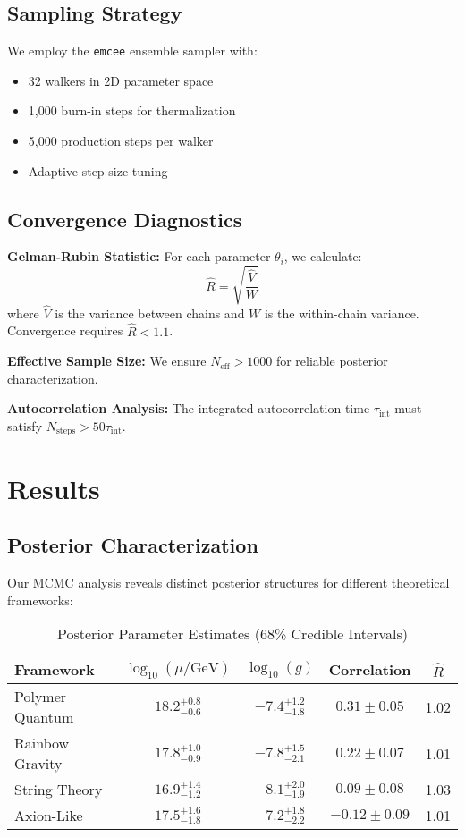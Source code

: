 \documentclass[12pt]{article}
\begin{document}
\subsection{Sampling Strategy}

We employ the \texttt{emcee} ensemble sampler with:
\begin{itemize}
\item 32 walkers in 2D parameter space
\item 1,000 burn-in steps for thermalization
\item 5,000 production steps per walker
\item Adaptive step size tuning
\end{itemize}

\subsection{Convergence Diagnostics}

\textbf{Gelman-Rubin Statistic:}
For each parameter $\theta_i$, we calculate:
\begin{equation}
\hat{R} = \sqrt{\frac{\hat{V}}{W}}
\end{equation}
where $\hat{V}$ is the variance between chains and $W$ is the within-chain variance. Convergence requires $\hat{R} < 1.1$.

\textbf{Effective Sample Size:}
We ensure $N_{\text{eff}} > 1000$ for reliable posterior characterization.

\textbf{Autocorrelation Analysis:}
The integrated autocorrelation time $\tau_{\text{int}}$ must satisfy $N_{\text{steps}} > 50\tau_{\text{int}}$.

\section{Results}

\subsection{Posterior Characterization}

Our MCMC analysis reveals distinct posterior structures for different theoretical frameworks:

\begin{table}[h]
\centering
\caption{Posterior Parameter Estimates (68\% Credible Intervals)}
\begin{tabular}{lcccc}
\toprule
Framework & $\log_{10}(\mu/\text{GeV})$ & $\log_{10}(g)$ & Correlation & $\hat{R}$ \\
\midrule
Polymer Quantum & $18.2^{+0.8}_{-0.6}$ & $-7.4^{+1.2}_{-1.8}$ & $0.31 \pm 0.05$ & 1.02 \\
Rainbow Gravity & $17.8^{+1.0}_{-0.9}$ & $-7.8^{+1.5}_{-2.1}$ & $0.22 \pm 0.07$ & 1.01 \\
String Theory & $16.9^{+1.4}_{-1.2}$ & $-8.1^{+2.0}_{-1.9}$ & $0.09 \pm 0.08$ & 1.03 \\
Axion-Like & $17.5^{+1.6}_{-1.8}$ & $-7.2^{+1.8}_{-2.2}$ & $-0.12 \pm 0.09$ & 1.01 \\
\bottomrule
\end{tabular}
\end{table}
\end{document}
